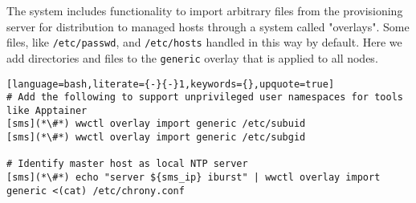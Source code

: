 The \Warewulf{} system includes functionality to import arbitrary files from
the provisioning server for distribution to managed hosts through a system 
called "overlays". Some files, like \texttt{/etc/passwd}, and \texttt{/etc/hosts}
handled in this way by default.  Here we add directories and files to the 
\texttt{generic} overlay that is applied to all nodes. 

\begin{lstlisting}[language=bash,literate={-}{-}1,keywords={},upquote=true]
# Add the following to support unprivileged user namespaces for tools like Apptainer
[sms](*\#*) wwctl overlay import generic /etc/subuid
[sms](*\#*) wwctl overlay import generic /etc/subgid

# Identify master host as local NTP server
[sms](*\#*) echo "server ${sms_ip} iburst" | wwctl overlay import generic <(cat) /etc/chrony.conf
\end{lstlisting}

